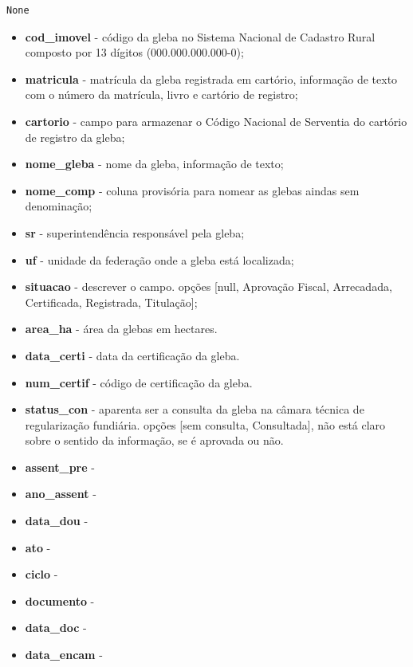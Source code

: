 \documentclass[
  letterpaper,
]{report}
\providecommand{\tightlist}{%
  \setlength{\itemsep}{0pt}\setlength{\parskip}{0pt}}\usepackage{longtable,booktabs,array}
\begin{document}
\begin{verbatim}
None
\end{verbatim}

\begin{itemize}
\tightlist
\item
  \textbf{cod\_imovel} - código da gleba no Sistema Nacional de Cadastro
  Rural composto por 13 dígitos (000.000.000.000-0);
\item
  \textbf{matricula} - matrícula da gleba registrada em cartório,
  informação de texto com o número da matrícula, livro e cartório de
  registro;
\item
  \textbf{cartorio} - campo para armazenar o Código Nacional de
  Serventia do cartório de registro da gleba;
\item
  \textbf{nome\_gleba} - nome da gleba, informação de texto;
\item
  \textbf{nome\_comp} - coluna provisória para nomear as glebas aindas
  sem denominação;
\item
  \textbf{sr} - superintendência responsável pela gleba;\\
\item
  \textbf{uf} - unidade da federação onde a gleba está localizada;\\
\item
  \textbf{situacao} - descrever o campo. opções {[}null, Aprovação
  Fiscal, Arrecadada, Certificada, Registrada, Titulação{]};
\item
  \textbf{area\_ha} - área da glebas em hectares.
\item
  \textbf{data\_certi} - data da certificação da gleba.
\item
  \textbf{num\_certif} - código de certificação da gleba.
\item
  \textbf{status\_con} - aparenta ser a consulta da gleba na câmara
  técnica de regularização fundiária. opções {[}sem consulta,
  Consultada{]}, não está claro sobre o sentido da informação, se é
  aprovada ou não.
\item
  \textbf{assent\_pre} -
\item
  \textbf{ano\_assent} -
\item
  \textbf{data\_dou} -
\item
  \textbf{ato} -
\item
  \textbf{ciclo} -\\
\item
  \textbf{documento} -
\item
  \textbf{data\_doc} -
\item
  \textbf{data\_encam} -

\end{itemize}
\end{document}
